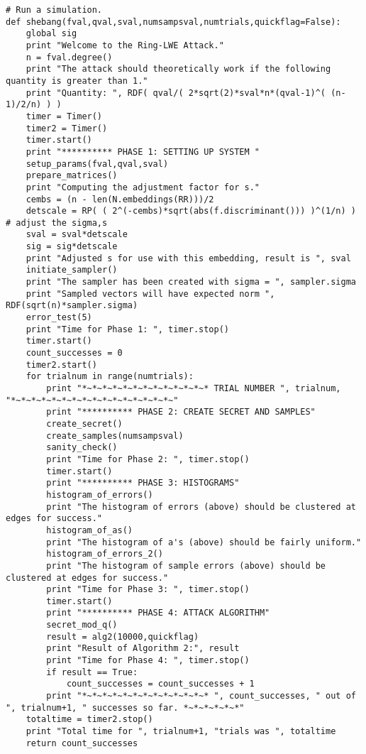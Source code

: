 \documentclass{llncs}
\newcommand{\<}{\langle}
\renewcommand{\>}{\rangle}
\begin{document}
\begin{verbatim}
# Run a simulation.
def shebang(fval,qval,sval,numsampsval,numtrials,quickflag=False):
    global sig
    print "Welcome to the Ring-LWE Attack."
    n = fval.degree()
    print "The attack should theoretically work if the following quantity is greater than 1."
    print "Quantity: ", RDF( qval/( 2*sqrt(2)*sval*n*(qval-1)^( (n-1)/2/n) ) )
    timer = Timer()
    timer2 = Timer()
    timer.start()
    print "********** PHASE 1: SETTING UP SYSTEM "
    setup_params(fval,qval,sval)
    prepare_matrices()
    print "Computing the adjustment factor for s."
    cembs = (n - len(N.embeddings(RR)))/2
    detscale = RP( ( 2^(-cembs)*sqrt(abs(f.discriminant())) )^(1/n) ) # adjust the sigma,s
    sval = sval*detscale
    sig = sig*detscale
    print "Adjusted s for use with this embedding, result is ", sval
    initiate_sampler()
    print "The sampler has been created with sigma = ", sampler.sigma
    print "Sampled vectors will have expected norm ", RDF(sqrt(n)*sampler.sigma)
    error_test(5)
    print "Time for Phase 1: ", timer.stop()
    timer.start()
    count_successes = 0
    timer2.start()
    for trialnum in range(numtrials):
        print "*~*~*~*~*~*~*~*~*~*~*~*~* TRIAL NUMBER ", trialnum, "*~*~*~*~*~*~*~*~*~*~*~*~*~*~*~*~"
        print "********** PHASE 2: CREATE SECRET AND SAMPLES"
        create_secret()
        create_samples(numsampsval)
        sanity_check()
        print "Time for Phase 2: ", timer.stop()
        timer.start()
        print "********** PHASE 3: HISTOGRAMS"
        histogram_of_errors()
        print "The histogram of errors (above) should be clustered at edges for success."
        histogram_of_as()
        print "The histogram of a's (above) should be fairly uniform."
        histogram_of_errors_2()
        print "The histogram of sample errors (above) should be clustered at edges for success."
        print "Time for Phase 3: ", timer.stop()
        timer.start()
        print "********** PHASE 4: ATTACK ALGORITHM"
        secret_mod_q()
        result = alg2(10000,quickflag)
        print "Result of Algorithm 2:", result
        print "Time for Phase 4: ", timer.stop()
        if result == True:
            count_successes = count_successes + 1
        print "*~*~*~*~*~*~*~*~*~*~*~*~* ", count_successes, " out of ", trialnum+1, " successes so far. *~*~*~*~*~*"
    totaltime = timer2.stop()
    print "Total time for ", trialnum+1, "trials was ", totaltime
    return count_successes

\end{verbatim}
\normalsize
\end{document}
